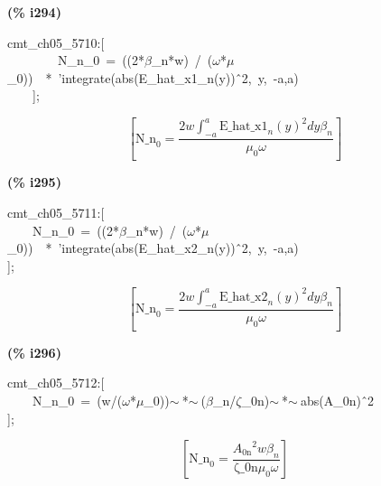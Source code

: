 \documentclass[fleqn]{article}
\begin{document}
\noindent
\begin{minipage}[t]{4.000000em}\color{red}\bfseries
(\% i294)	
\end{minipage}
\begin{minipage}[t]{\textwidth}\color{blue}
cmt\_ch05\_5710:[\\
\ \ \ \ \ \ \ \ N\_n\_0\ =\ ((2*\ensuremath{\beta}\_n*w)\ /\ (\ensuremath{\omega}*\ensuremath{\mu}\_0))\ \ *\ 'integrate(abs(E\_hat\_x1\_n(y))\^\ 2,\ y,\ -a,a)\\
\ \ \ \ ];
\end{minipage}
\[\displaystyle \tag{\% o294} 
\left[ {{\ensuremath{\mathrm{N\_ n}}}_0}=\frac{2 w \int_{-a}^{a}{\left. {{{{\ensuremath{\mathrm{E\_ hat\_ x1}}}_n}(y)}^{2}}dy\right.} {{\beta }_n}}{{{\mu }_0} \omega }\right] \mbox{}
\]


\noindent
\begin{minipage}[t]{4.000000em}\color{red}\bfseries
(\% i295)	
\end{minipage}
\begin{minipage}[t]{\textwidth}\color{blue}
cmt\_ch05\_5711:[\\
\ \ \ \ N\_n\_0\ =\ ((2*\ensuremath{\beta}\_n*w)\ /\ (\ensuremath{\omega}*\ensuremath{\mu}\_0))\ \ *\ 'integrate(abs(E\_hat\_x2\_n(y))\^\ 2,\ y,\ -a,a)\\
];
\end{minipage}
\[\displaystyle \tag{\% o295} 
\left[ {{\ensuremath{\mathrm{N\_ n}}}_0}=\frac{2 w \int_{-a}^{a}{\left. {{{{\ensuremath{\mathrm{E\_ hat\_ x2}}}_n}(y)}^{2}}dy\right.} {{\beta }_n}}{{{\mu }_0} \omega }\right] \mbox{}
\]


\noindent
\begin{minipage}[t]{4.000000em}\color{red}\bfseries
(\% i296)	
\end{minipage}
\begin{minipage}[t]{\textwidth}\color{blue}
cmt\_ch05\_5712:[\\
\ \ \ \ N\_n\_0\ =\ (w/(\ensuremath{\omega}*\ensuremath{\mu}\_0))\ensuremath{\sim\ }*\ensuremath{\sim\ }(\ensuremath{\beta}\_n/\ensuremath{\zeta}\_0n)\ensuremath{\sim\ }*\ensuremath{\sim\ }abs(A\_0n)\^\ 2\\
];
\end{minipage}
\[\displaystyle \tag{\% o296} 
\left[ {{\ensuremath{\mathrm{N\_ n}}}_0}=\frac{{{{A_{\ensuremath{\mathrm{0n}}}}}^{2}} w {{\beta }_n}}{\ensuremath{\mathrm{\zeta \_ 0n}} {{\mu }_0} \omega }\right] \mbox{}
\]
\end{document}
